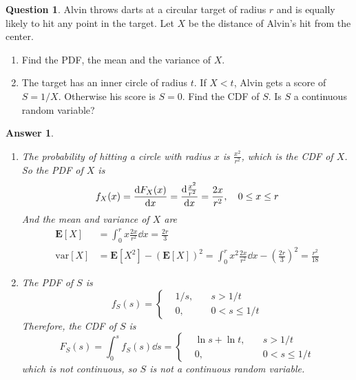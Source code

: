 \documentclass[utf8]{article}
\theoremstyle{definition}%
\newtheorem{question}{Question} %
\theoremstyle{plain}%
\newtheorem{answer}{Answer} %
\begin{document}
\begin{question}
    Alvin throws darts at a circular target of radius $r$ and is equally likely to hit any point in the target. Let $X$ be the distance of Alvin's hit from the center.
    \begin{enumerate}[label=(\alph*)]
        \item Find the PDF, the mean and the variance of $X$.
        \item The target has an inner circle of radius $t$. If $X < t$, Alvin gets a score of $S = 1/X$. Otherwise his score is $S = 0$. Find the CDF of $S$. Is $S$ a continuous random variable?
    \end{enumerate}
\end{question}
\begin{answer} ~
    \begin{enumerate}[label=(\alph*)]
        \item The probability of hitting a circle with radius $x$ is $\frac{x^2}{r^2}$, which is the CDF of $X$. So the PDF of $X$ is
        \begin{equation}
            f_{X}(x) = \dv{F_{X}(x)}{x} = \dv{\frac{x^2}{r^2}}{x} = \frac{2x}{r^2}, \quad 0 \leq x \leq r
        \end{equation}
        And the mean and variance of $X$ are
        \begin{align}
            \mathbf{E}[X] &= \int_{0}^{r} x\frac{2x}{r^2} \dd{x} = \frac{2r}{3} \\ 
            \text{var}[X] &= \mathbf{E}[X^2] - (\mathbf{E}[X])^2 = \int_{0}^{r} x^2\frac{2x}{r^2} \dd{x} - \left(\frac{2r}{3}\right)^2 = \frac{r^2}{18}
        \end{align}
        \item The PDF of $S$ is
        \begin{equation}
            f_{S}(s) = \left\{
            \begin{aligned}
                &1/s, \quad &s > 1/t \\
                &0, \quad &0 < s \leq 1/t
            \end{aligned}\right.
        \end{equation}
        Therefore, the CDF of $S$ is
        \begin{equation}
            F_{S}(s) = \int_{0}^{s}f_{S}(s) \dd{s} = \left\{
            \begin{aligned}
                &\ln s + \ln t, \quad &s > 1/t \\
                &0, \quad &0 < s \leq 1/t
            \end{aligned}\right.
        \end{equation}
        which is not continuous, so $S$ is not a continuous random variable.
    \end{enumerate}
\end{answer}
\end{document}
